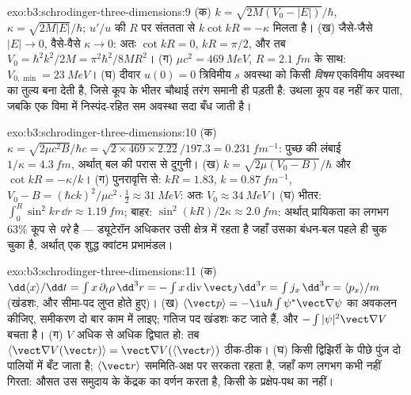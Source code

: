 \begin{solution}{exo:b3:schrodinger-three-dimensions:9}
(क) $k = \sqrt{2M(V_0 - |E|)}/\hbar$, $\kappa = \sqrt{2M|E|}/\hbar$;
$u'/u$ की $R$ पर संततता से $k\cot kR = -\kappa$ मिलता है। (ख) जैसे-जैसे $|E|
\to 0$, वैसे-वैसे $\kappa \to 0$: अतः $\cot kR = 0$, $kR = \pi/2$, और तब $V_0 =
\hbar^2k^2/2M = \pi^2\hbar^2/8MR^2$। (ग) $\mu c^2 =
\qty{469}{MeV}$, $R = \qty{2.1}{fm}$ के साथ: $V_{0,\min} = \qty{23}{MeV}$।
(घ) दीवार $u(0) = 0$ त्रिविमीय $s$ अवस्था को किसी
\emph{विषम} एकविमीय अवस्था का तुल्य बना देती है, जिसे कूप के भीतर
चौथाई तरंग समानी ही पड़ती है: उथला कूप वह नहीं कर पाता, जबकि एक विमा में
निस्पंद-रहित सम अवस्था सदा बँध जाती है।
\end{solution}

\begin{solution}{exo:b3:schrodinger-three-dimensions:10}
(क) $\kappa = \sqrt{2\mu c^2B}/\hbar c = \sqrt{2 \times 469 \times
2.22}/197.3 = \qty{0.231}{fm^{-1}}$: पुच्छ की लंबाई $1/\kappa =
\qty{4.3}{fm}$, अर्थात् बल की परास से दुगुनी। (ख) $k =
\sqrt{2\mu(V_0 - B)}/\hbar$ और $\cot kR = -\kappa/k$। (ग) पुनरावृत्ति से:
$kR = 1.83$, $k = \qty{0.87}{fm^{-1}}$, $V_0 - B = (\hbar ck)^2/\mu
c^2\cdot\tfrac12 \approx \qty{31}{MeV}$: अतः $V_0 \approx \qty{34}{MeV}$।
(घ) भीतर: $\int_0^R\sin^2kr\,\dd r \approx \qty{1.19}{fm}$;
बाहर: $\sin^2(kR)/2\kappa \approx \qty{2.0}{fm}$: अर्थात् प्रायिकता का
लगभग $63\%$ कूप से \emph{परे} है --- ड्यूटेरॉन अधिकतर उसी क्षेत्र में
रहता है जहाँ उसका बंधन-बल पहले ही चुक चुका है, अर्थात् एक शुद्ध
क्वांटम प्रभामंडल।
\end{solution}

\begin{solution}{exo:b3:schrodinger-three-dimensions:11}
(क) $\dd\langle x\rangle/\dd t = \int x\,\partial_t\rho\,\dd^3r =
-\int x\operatorname{div}\vect\jmath\,\dd^3r = \int j_x\,\dd^3r =
\langle p_x\rangle/m$ (खंडशः, और सीमा-पद लुप्त होते हुए)। (ख)
$\langle\vect p\rangle = -\iu\hbar\int\psi^*\vect\nabla
\psi$ का अवकलन कीजिए, समीकरण दो बार काम में लाइए; गतिज पद खंडशः कट
जाते हैं, और $-\int|\psi|^2\vect\nabla V$ बचता है। (ग) $V$ अधिक से
अधिक द्विघात हो: तब $\langle\vect\nabla V(\vect r)\rangle = \vect\nabla V(\langle
\vect r\rangle)$ ठीक-ठीक। (घ) किसी द्विझिर्री के पीछे पुंज दो
पालियों में बँट जाता है; $\langle\vect r\rangle$ सममिति-अक्ष पर सरकता
रहता है, जहाँ कण लगभग कभी नहीं गिरता: औसत उस समुदाय के केंद्रक का
वर्णन करता है, किसी के प्रक्षेप-पथ का नहीं।
\end{solution}

